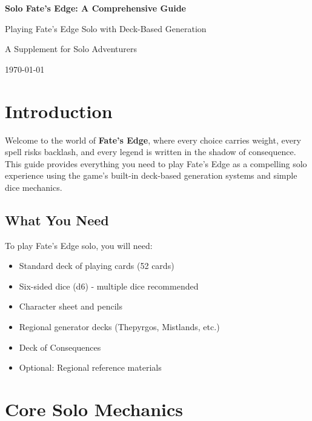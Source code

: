 \documentclass[11pt]{article}
\begin{document}
\begin{titlepage}
\centering
\vspace*{2cm}
{\Huge\bfseries Solo Fate's Edge: A Comprehensive Guide\par}
\vspace{1cm}
{\Large Playing Fate's Edge Solo with Deck-Based Generation\par}
\vspace{2cm}
{\large A Supplement for Solo Adventurers\par}
\vspace{3cm}
{\large \today\par}
\end{titlepage}

\tableofcontents
\newpage

\section{Introduction}

Welcome to the world of \textbf{Fate's Edge}, where every choice carries weight, every spell risks backlash, and every legend is written in the shadow of consequence. This guide provides everything you need to play Fate's Edge as a compelling solo experience using the game's built-in deck-based generation systems and simple dice mechanics.

\subsection{What You Need}

To play Fate's Edge solo, you will need:
\begin{itemize}[leftmargin=*]
    \item Standard deck of playing cards (52 cards)
    \item Six-sided dice (d6) - multiple dice recommended
    \item Character sheet and pencils
    \item Regional generator decks (Thepyrgos, Mistlands, etc.)
    \item Deck of Consequences
    \item Optional: Regional reference materials
\end{itemize}

\section{Core Solo Mechanics}
\end{document}
